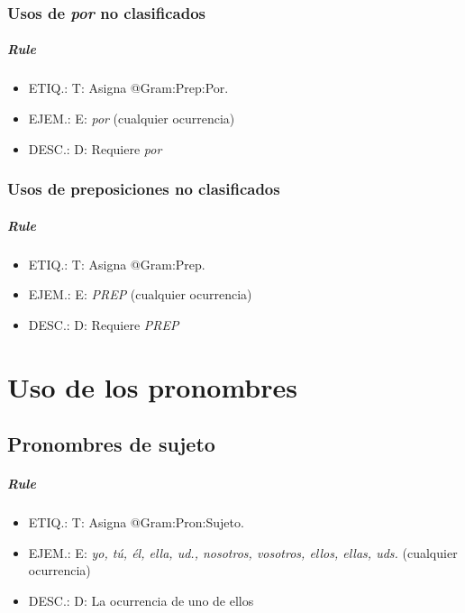 \documentclass[11pt]{report}
\begin{document}
\subsection{Usos de \emph{por} no clasificados}
\paragraph*{Rule}
\begin{itemize}
\item ETIQ.:  T: Asigna @Gram:Prep:Por.
\item EJEM.:  E: \emph{por} (cualquier ocurrencia)
\item DESC.:  D: Requiere \emph{por}
\end{itemize}

\subsection{Usos de preposiciones no clasificados}
\paragraph*{Rule}
\begin{itemize}
\item ETIQ.:  T: Asigna @Gram:Prep.
\item EJEM.:  E: \emph{PREP} (cualquier ocurrencia)
\item DESC.:  D: Requiere \emph{PREP}
\end{itemize}

\chapter{Uso de los pronombres}
\section{Pronombres de sujeto}
\paragraph*{Rule}
\begin{itemize}
\item ETIQ.:  T: Asigna @Gram:Pron:Sujeto.
\item EJEM.:  E: \emph{yo, tú, él, ella, ud., nosotros, vosotros, ellos, ellas, uds.} (cualquier ocurrencia)
\item DESC.:  D: La ocurrencia de uno de ellos
\end{itemize}
\end{document}
